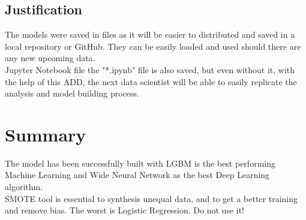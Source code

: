 \documentclass{homeworg}
\begin{document}
\subsection{Justification}
The models were saved in files as it will be easier to distributed and saved in a local repository or GitHub. They can be easily loaded and used should there are any new upcoming data. \\
Jupyter Notebook file the "*.ipynb" file is also saved, but even without it, with the help of this ADD, the next data scientist will be able to easily replicate the analysis and model building process.

\section{Summary}
The model has been successfully built with LGBM is the best performing Machine Learning and Wide Neural Network as the best Deep Learning algorithm. \\
SMOTE tool is essential to synthesis unequal data, and to get a better training and remove bias.
The worst is Logistic Regression. Do not use it!
\end{document}

